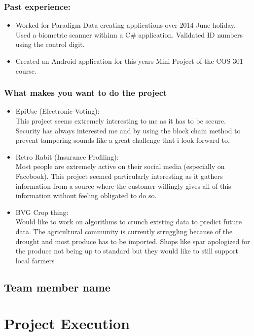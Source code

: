 \documentclass{article}
\begin{document}
	\subsubsection{Past experience:}
	\begin{itemize}
		\item Worked for Paradigm Data creating applications over 2014 June holiday. Used a biometric scanner withinn a C\# application. Validated ID numbers using the control digit.
		\item Created an Android application for this years Mini Project of the COS 301 course.
	\end{itemize}

	\subsubsection{What makes you want to do the project}
	\begin{itemize}
		\item EpiUse (Electronic Voting):\\
			This project seems extremely interesting to me as it has to be secure. Security has always interested me and by using the block chain method to prevent tampering sounds like a great challenge that i look forward to.
		\item Retro Rabit (Insurance Profiling):\\
			Most people are extremely active on their social media (especially on Facebook). This project seemed particularly interesting as it gathers information from a source where the customer willingly gives all of this information without feeling obligated to do so.
		\item BVG Crop thing:\\
			Would like to work on algorithms to crunch existing data to predict future data. The agricultural community is currently struggling because of the drought and most produce has to be imported. Shops like spar apologized for the produce not being up to standard but they would like to still support local farmers
	\end{itemize}

	\subsection{Team member name}
	
	\section{Project Execution}
\end{document}
